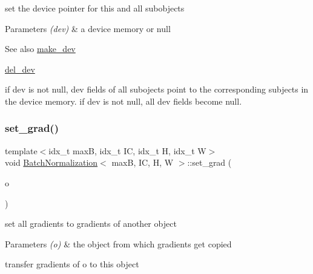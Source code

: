 set the device pointer for this and all subobjects 


\begin{DoxyParams}{Parameters}
{\em (dev)} & a device memory or null \\
\hline
\end{DoxyParams}
\begin{DoxySeeAlso}{See also}
\hyperlink{structBatchNormalization_a0d925e23b6e4d49e64319dd02d93b480}{make\+\_\+dev} 

\hyperlink{structBatchNormalization_a3698340b540985a0cb1d5d2711fc8334}{del\+\_\+dev}
\end{DoxySeeAlso}
if dev is not null, dev fields of all subojects point to the corresponding subjects in the device memory. if dev is not null, all dev fields become null. \mbox{\label{structBatchNormalization_aeadf5127ff94fb3e53c30272e7346f0d}} 
\subsubsection{\texorpdfstring{set\+\_\+grad()}{set\_grad()}}
{\footnotesize\ttfamily template$<$idx\+\_\+t maxB, idx\+\_\+t IC, idx\+\_\+t H, idx\+\_\+t W$>$ \\
void \hyperlink{structBatchNormalization}{Batch\+Normalization}$<$ maxB, IC, H, W $>$\+::set\+\_\+grad (\begin{DoxyParamCaption}\item[{\hyperlink{structBatchNormalization}{Batch\+Normalization}$<$ maxB, IC, H, W $>$ \&}]{o }\end{DoxyParamCaption})\hspace{0.3cm}{\ttfamily [inline]}}



set all gradients to gradients of another object 


\begin{DoxyParams}{Parameters}
{\em (o)} & the object from which gradients get copied\\
\hline
\end{DoxyParams}
transfer gradients of o to this object \mbox{\label{structBatchNormalization_a71b4c3d0b5002d84ba2d74f47f7ab8d2}} 
